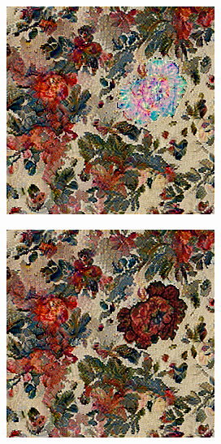 \begin{figure}[]
\begin{subfigure}{\textwidth}
\begin{subfigure}{0.24\textwidth}
            \caption*{}
        \end{subfigure}
        \hfill
        \begin{subfigure}{0.24\textwidth}
            \centering
            \includegraphics[width=\textwidth]{images/04-experiment01/flowers/1000/one_im.jpg}
            \caption*{}
        \end{subfigure}
        \hfill
        \begin{subfigure}{0.24\textwidth}
            \centering
            \includegraphics[width=\textwidth]{images/04-experiment01/flowers/1000/one_proj.jpg}
            \caption*{}
        \end{subfigure}


\end{subfigure}
\end{figure}
